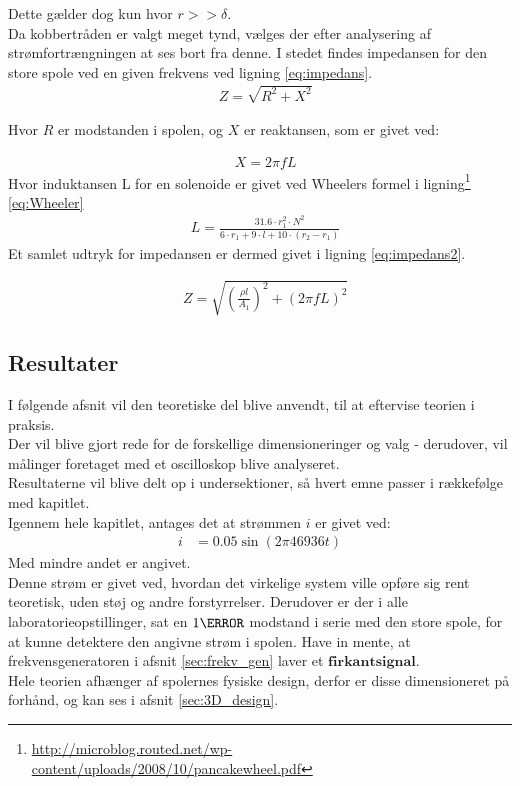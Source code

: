 
Dette gælder dog kun hvor $r>>\delta$. \\
Da kobbertråden er valgt meget tynd, vælges der efter analysering af strømfortrængningen at ses bort fra denne. 
I stedet findes impedansen for den store spole ved en given frekvens ved ligning \ref{eq:impedans}.
\begin{align}
	& Z=\sqrt{R^2+X^2} \label{eq:impedans}
\end{align}

Hvor $R$ er modstanden i spolen, og $X$ er reaktansen, som er givet ved:

\begin{align}
	& X=2\pi f L \nonumber
\end{align}
Hvor induktansen L for en solenoide er givet ved Wheelers formel i ligning\footnote{\url{http://microblog.routed.net/wp-content/uploads/2008/10/pancakewheel.pdf}} \ref{eq:Wheeler}
\begin{align}
	& L =\frac{31.6\cdot r_1^2\cdot N^2}{6\cdot r_1+9\cdot l + 10\cdot (r_2-r_1)}  \label{eq:Wheeler}
\end{align}
Et samlet udtryk for impedansen er dermed givet i ligning \ref{eq:impedans2}.

\begin{align}
	& Z=\sqrt{\left(\frac{\rho l}{A_1}\right)^2+\left(2\pi f L\right)^2} \label{eq:impedans2}
\end{align}


\subsection{Resultater}
I følgende afsnit vil den teoretiske del blive anvendt, til at eftervise teorien i praksis.\\
Der vil blive gjort rede for de forskellige dimensioneringer og valg - derudover, vil målinger foretaget med et oscilloskop blive analyseret.\\ 
Resultaterne vil blive delt op i undersektioner, så hvert emne passer i rækkefølge med kapitlet.\\
Igennem hele kapitlet, antages det at strømmen $i$ er givet ved:
\begin{align}
	 i&=0.05\sin{(2\pi46936 t)} \nonumber
\end{align}
Med mindre andet er angivet.\\
Denne strøm er givet ved, hvordan det virkelige system ville opføre sig rent teoretisk, uden støj og andre forstyrrelser.
Derudover er der i alle laboratorieopstillinger, sat en $1\ohm$ modstand i serie med den store spole, for at kunne detektere den angivne strøm i spolen.
Have in mente, at frekvensgeneratoren i afsnit \ref{sec:frekv_gen} laver et $\textbf{firkantsignal}$.\\ 
Hele teorien afhænger af spolernes fysiske design, derfor er disse dimensioneret på forhånd, og kan ses i afsnit \ref{sec:3D_design}.

